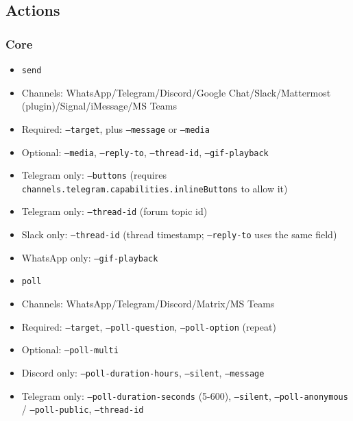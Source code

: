 \subsection{Actions}


\subsubsection{Core}


\begin{itemize}
  \item \texttt{send}
  \item Channels: WhatsApp/Telegram/Discord/Google Chat/Slack/Mattermost (plugin)/Signal/iMessage/MS Teams
  \item Required: \texttt{--target}, plus \texttt{--message} or \texttt{--media}
  \item Optional: \texttt{--media}, \texttt{--reply-to}, \texttt{--thread-id}, \texttt{--gif-playback}
  \item Telegram only: \texttt{--buttons} (requires \texttt{channels.telegram.capabilities.inlineButtons} to allow it)
  \item Telegram only: \texttt{--thread-id} (forum topic id)
  \item Slack only: \texttt{--thread-id} (thread timestamp; \texttt{--reply-to} uses the same field)
  \item WhatsApp only: \texttt{--gif-playback}
\end{itemize}


\begin{itemize}
  \item \texttt{poll}
  \item Channels: WhatsApp/Telegram/Discord/Matrix/MS Teams
  \item Required: \texttt{--target}, \texttt{--poll-question}, \texttt{--poll-option} (repeat)
  \item Optional: \texttt{--poll-multi}
  \item Discord only: \texttt{--poll-duration-hours}, \texttt{--silent}, \texttt{--message}
  \item Telegram only: \texttt{--poll-duration-seconds} (5-600), \texttt{--silent}, \texttt{--poll-anonymous} / \texttt{--poll-public}, \texttt{--thread-id}
\end{itemize}


